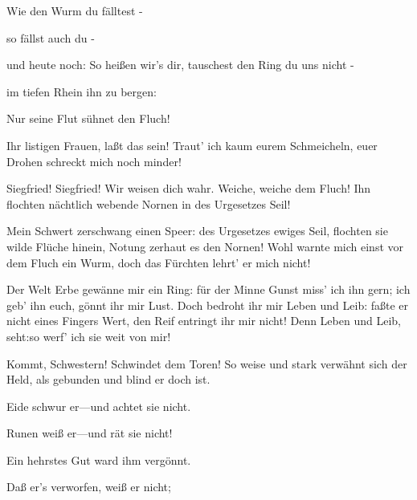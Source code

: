 \begin{drama}
\Flosshildespeaks

Wie den Wurm du fälltest -
 

so fällst auch du -
 

und heute noch:
So heißen wir's dir,
tauschest den Ring du uns nicht -
 

im tiefen Rhein ihn zu bergen:
 

Nur seine Flut sühnet den Fluch!
 

\Siegfriedspeaks

Ihr listigen Frauen, laßt das sein!
Traut' ich kaum eurem Schmeicheln,
euer Drohen schreckt mich noch minder!
 

Siegfried! Siegfried!
Wir weisen dich wahr.
Weiche, weiche dem Fluch!
Ihn flochten nächtlich webende Nornen
in des Urgesetzes Seil!
 

\Siegfriedspeaks

Mein Schwert zerschwang einen Speer:
des Urgesetzes ewiges Seil,
flochten sie wilde Flüche hinein,
Notung zerhaut es den Nornen!
Wohl warnte mich einst
vor dem Fluch ein Wurm,
doch das Fürchten lehrt' er mich nicht!


Der Welt Erbe gewänne mir ein Ring:
für der Minne Gunst miss' ich ihn gern;
ich geb' ihn euch, gönnt ihr mir Lust.
Doch bedroht ihr mir Leben und Leib:
faßte er nicht eines Fingers Wert,
den Reif entringt ihr mir nicht!
Denn Leben und Leib,
seht:so werf' ich sie weit von mir!
 




Kommt, Schwestern!
Schwindet dem Toren!
So weise und stark verwähnt sich der Held,
als gebunden und blind er doch ist.


Eide schwur er---und achtet sie nicht.


Runen weiß er---und rät sie nicht!
 

Ein hehrstes Gut ward ihm vergönnt.
 

Daß er's verworfen, weiß er nicht;
 


\end{drama}
